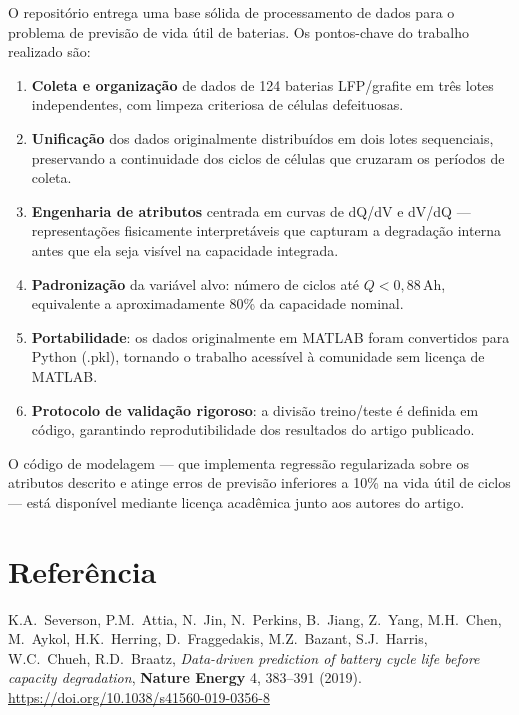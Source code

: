 \documentclass[12pt,a4paper]{article}
\begin{document}
O reposit\'{o}rio entrega uma base s\'{o}lida de processamento de dados para o problema
de previs\~ao de vida \'{u}til de baterias. Os pontos-chave do trabalho realizado s\~ao:

\begin{enumerate}
  \item \textbf{Coleta e organiza\c{c}\~ao} de dados de 124 baterias LFP/grafite em
    tr\^{e}s lotes independentes, com limpeza criteriosa de c\'{e}lulas defeituosas.

  \item \textbf{Unifica\c{c}\~ao} dos dados originalmente distribu\'{i}dos em dois lotes
    sequenciais, preservando a continuidade dos ciclos de c\'{e}lulas que
    cruzaram os per\'{i}odos de coleta.

  \item \textbf{Engenharia de atributos} centrada em curvas de dQ/dV e dV/dQ
    --- representa\c{c}\~oes fisicamente interpret\'{a}veis que capturam a degrada\c{c}\~ao
    interna antes que ela seja vis\'{i}vel na capacidade integrada.

  \item \textbf{Padroniza\c{c}\~ao} da vari\'{a}vel alvo: n\'{u}mero de ciclos at\'{e}
    $Q < 0{,}88$\,Ah, equivalente a aproximadamente 80\% da capacidade nominal.

  \item \textbf{Portabilidade}: os dados originalmente em MATLAB foram
    convertidos para Python (.pkl), tornando o trabalho acess\'{i}vel \`{a} comunidade
    sem licen\c{c}a de MATLAB.

  \item \textbf{Protocolo de valida\c{c}\~ao rigoroso}: a divis\~ao treino/teste \'{e}
    definida em c\'{o}digo, garantindo reprodutibilidade dos resultados do artigo
    publicado.
\end{enumerate}

O c\'{o}digo de modelagem --- que implementa regress\~ao regularizada sobre os atributos
descrito e atinge erros de previs\~ao inferiores a 10\% na vida \'{u}til de ciclos ---
est\'{a} dispon\'{i}vel mediante licen\c{c}a acad\^{e}mica junto aos autores do artigo.

\section*{Refer\^{e}ncia}

K.A.~Severson, P.M.~Attia, N.~Jin, N.~Perkins, B.~Jiang, Z.~Yang,
M.H.~Chen, M.~Aykol, H.K.~Herring, D.~Fraggedakis, M.Z.~Bazant,
S.J.~Harris, W.C.~Chueh, R.D.~Braatz,
\textit{Data-driven prediction of battery cycle life before capacity degradation},
\textbf{Nature Energy} 4, 383--391 (2019).
\url{https://doi.org/10.1038/s41560-019-0356-8}
\end{document}
